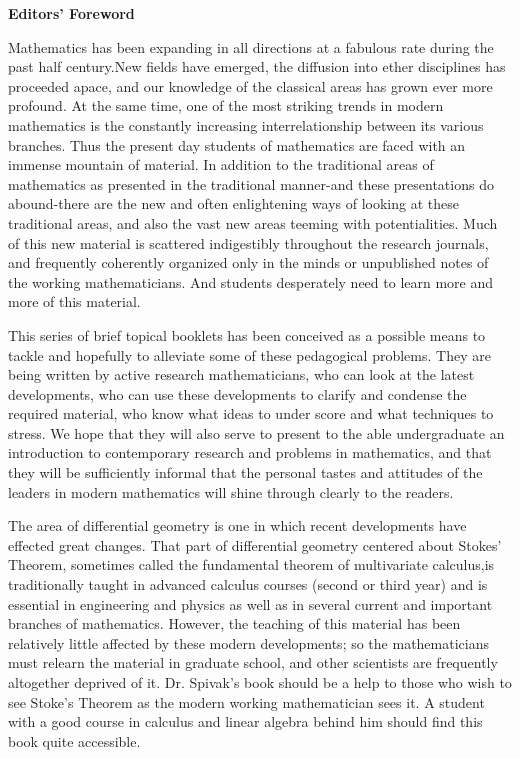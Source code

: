 \thispagestyle{empty}
\vspace*{4em}
\begin{center}
  {\bfseries\sffamily\Huge Editors' Foreword}
\end{center}
\vspace*{5em}
  Mathematics has been expanding in all directions at a fabulous
rate during the past half century.New fields have emerged,
the diffusion into ether disciplines has proceeded apace, and
our knowledge of the classical areas has grown ever more profound. 
At the same time, one of the most striking trends in
modern mathematics is the constantly increasing interrelationship 
between its various branches. Thus the present day
students of mathematics are faced with an immense mountain
of material. In addition to the traditional areas of mathematics 
as presented in the traditional manner-and these
presentations do abound-there are the new and often enlightening 
ways of looking at these traditional areas, and also
the vast new areas teeming with potentialities. Much of this
new material is scattered indigestibly throughout the research
journals, and frequently coherently organized only in the
minds or unpublished notes of the working mathematicians.
And students desperately need to learn more and more of this
material.

    This series of brief topical booklets has been conceived as a
possible means to tackle and hopefully to alleviate some of 
these pedagogical problems. They are being written by active
research mathematicians, who can look at the latest developments, 
who can use these developments to clarify and condense the required material, 
who know what ideas to under score and what techniques to stress. We hope that they will
also serve to present to the able undergraduate an introduction
to contemporary research and problems in mathematics, and
that they will be sufficiently informal that the personal tastes
and attitudes of the leaders in modern mathematics will shine
through clearly to the readers. 

The area of differential geometry is one in which recent developments 
have effected great changes. That part of differential geometry centered 
about Stokes' Theorem, sometimes called the fundamental theorem of multivariate 
calculus,is traditionally taught in advanced calculus courses (second or
third year) and is essential in engineering and physics as well
as in several current and important branches of mathematics.
However, the teaching of this material has been relatively
little affected by these modern developments; so the mathematicians 
must relearn the material in graduate school, and
other scientists are frequently altogether deprived of it. Dr.
Spivak's book should be a help to those who wish to see
Stoke's Theorem as the modern working mathematician sees
it. A student with a good course in calculus and linear 
algebra behind him should find this book quite accessible.

